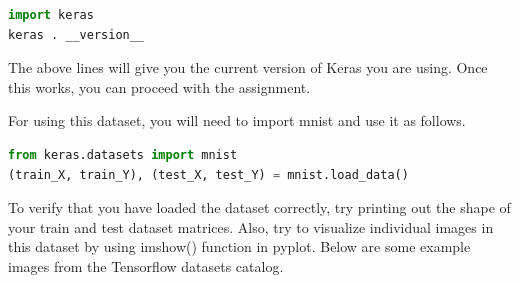 \documentclass[10pt, a4paper]{article}
\begin{document}
\begin{lstlisting}[language=Python]
import keras
keras . __version__
\end{lstlisting}

The above lines will give you the current version of Keras you are using. Once this works, you can proceed with the assignment.

\begin{Problem*}
For using this dataset, you will need to import mnist and use it as follows.

\begin{lstlisting}[language=Python]
from keras.datasets import mnist
(train_X, train_Y), (test_X, test_Y) = mnist.load_data()
\end{lstlisting}

To verify that you have loaded the dataset correctly, try printing out the shape of your train and test dataset matrices. Also, try to visualize individual images in this dataset by using imshow() function in pyplot. Below are some example images from the Tensorflow datasets catalog.

\end{Problem*}
\end{document}
